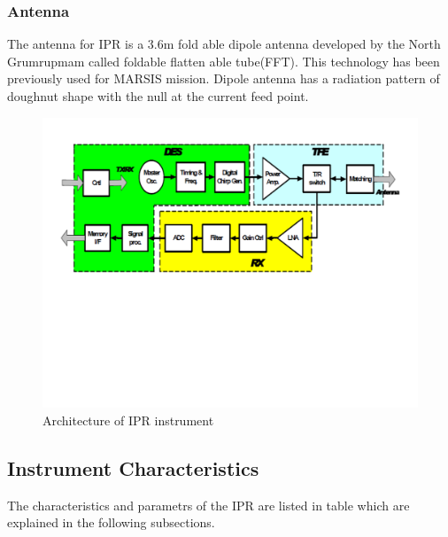 \subsubsection{Antenna}
The antenna for \ac{IPR} is a 3.6m fold able dipole antenna developed by the North Grumrupmam called foldable flatten able tube(FFT). This technology  has been previously used for \ac{MARSIS} mission. Dipole antenna has a radiation pattern of doughnut shape with the null at the  current feed point.
\begin{figure}[bht]
\centering
\includegraphics[scale=0.5]{Figures/IPR_Architecture.pdf}
\caption{Architecture of \ac{IPR} instrument \cite{IPR_performance}}
\label{fig:IPR_achitecture}
\end{figure}
%
\subsection{Instrument Characteristics}
The characteristics and parametrs of the \ac{IPR} are listed in table which are explained in the following subsections.\\

